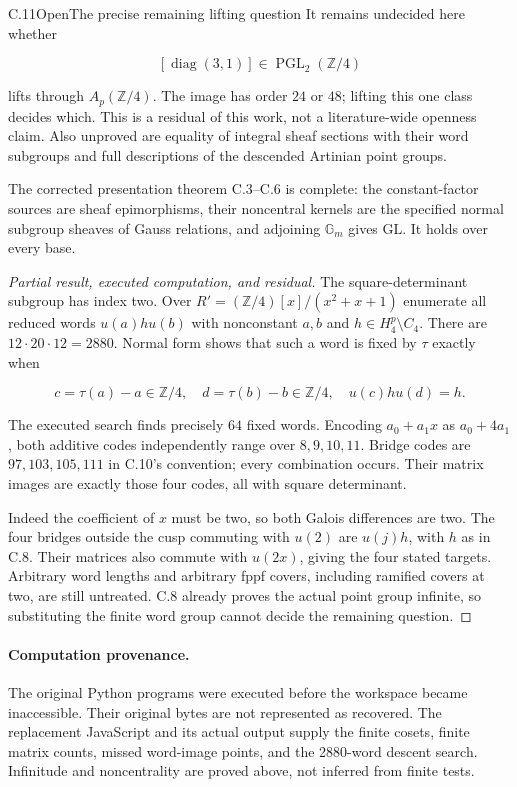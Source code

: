 \begin{statement}{C.11}{Open}{The precise remaining lifting question}
It remains undecided here whether

$$
[\operatorname{diag}(3,1)]\in
 \operatorname{PGL}_2(\mathbb Z/4)
$$

lifts through $A_p(\mathbb Z/4)$.
The image has order $24$ or $48$; lifting this one class
decides which. This is a residual of this work, not a
literature-wide openness claim.
Also unproved are equality of integral sheaf sections
with their word subgroups and full descriptions of the
descended Artinian point groups.

The corrected presentation theorem C.3--C.6 is complete:
the constant-factor sources are sheaf epimorphisms,
their noncentral kernels are the specified normal
subgroup sheaves of Gauss relations, and adjoining
$\mathbb G_m$ gives GL. It holds over every base.
\end{statement}
\begin{proof}[Partial result, executed computation, and residual]
The square-determinant subgroup has index two.
Over $R'=(\mathbb Z/4)[x]/(x^2+x+1)$ enumerate all reduced
words $u(a)hu(b)$ with nonconstant $a,b$ and
$h\in H_4^p\setminus C_4$. There are $12\cdot20\cdot12=2880$.
Normal form shows that such a word is fixed by $\tau$
exactly when

$$
c=\tau(a)-a\in\mathbb Z/4,\quad
 d=\tau(b)-b\in\mathbb Z/4,\quad u(c)hu(d)=h.
$$

The executed search finds precisely $64$ fixed words.
Encoding $a_0+a_1x$ as $a_0+4a_1$, both additive codes
independently range over $8,9,10,11$.
Bridge codes are $97,103,105,111$ in C.10's convention;
every combination occurs. Their matrix images are exactly
those four codes, all with square determinant.

Indeed the coefficient of $x$ must be two, so both Galois
differences are two. The four bridges outside the cusp
commuting with $u(2)$ are $u(j)h$, with $h$ as in C.8.
Their matrices also commute with $u(2x)$, giving the
four stated targets.
Arbitrary word lengths and arbitrary fppf covers,
including ramified covers at two, are still untreated.
C.8 already proves the actual point group infinite,
so substituting the finite word group cannot decide
the remaining question.
\end{proof}

\paragraph{Computation provenance.}
The original Python programs were executed before the
workspace became inaccessible. Their original bytes are
not represented as recovered. The replacement JavaScript
and its actual output supply the finite cosets, finite
matrix counts, missed word-image points, and the
2880-word descent search. Infinitude and noncentrality
are proved above, not inferred from finite tests.
